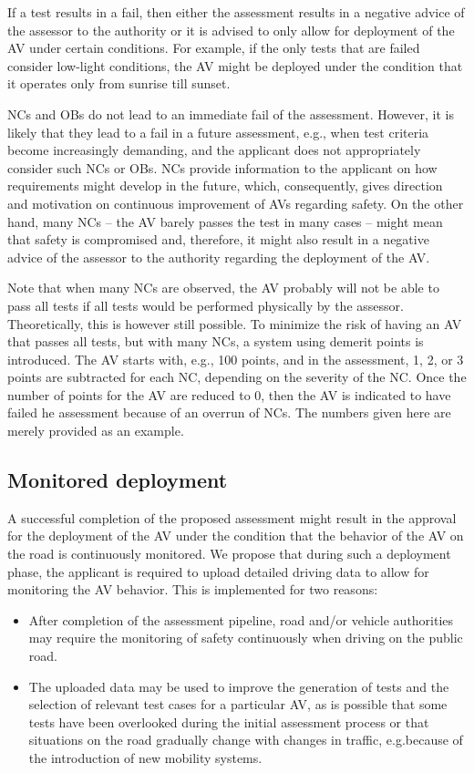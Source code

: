 \documentclass[twoside,twocolumn,9pt]{article}
\theoremstyle{plain}
\theoremstyle{remark}\newtheorem{remarkenv}{Remark}        %
\begin{document}
If a test results in a fail, then either the assessment results in a negative advice of the assessor to the authority or it is advised to only allow for deployment of the AV under certain conditions. For example, if the only tests that are failed consider low-light conditions, the AV might be deployed under the condition that it operates only from sunrise till sunset. 

NCs and OBs do not lead to an immediate fail of the assessment. However, it is likely that they lead to a fail in a future assessment, e.g., when test criteria become increasingly demanding, and the applicant does not appropriately consider such NCs or OBs. NCs provide information to the applicant on how requirements might develop in the future, which, consequently, gives direction and motivation on continuous improvement of AVs regarding safety. On the other hand, many NCs – the AV barely passes the test in many cases – might mean that safety is compromised and, therefore, it might also result in a negative advice of the assessor to the authority regarding the deployment of the AV.

Note that when many NCs are observed, the AV probably will not be able to pass all tests if all tests would be performed physically by the assessor. Theoretically, this is however still possible. To minimize the risk of having an AV that passes all tests, but with many NCs, a system using demerit points is introduced. The AV starts with, e.g., 100 points, and in the assessment, 1, 2, or 3 points are subtracted for each NC, depending on the severity of the NC. Once the number of points for the AV are reduced to 0, then the AV is indicated to have failed he assessment because of an overrun of NCs. The numbers given here are merely provided as an example.



\subsection{Monitored deployment}
\label{sec:monitored deployment}

A successful completion of the proposed assessment might result in the approval for the deployment of the AV under the condition that the behavior of the AV on the road is continuously monitored. We propose that during such a deployment phase, the applicant is required to upload detailed driving data to allow for monitoring the AV behavior. This is implemented for two reasons:
\begin{itemize}
	\item After completion of the assessment pipeline, road and/or vehicle authorities may require the monitoring of safety continuously when driving on the public road.
	\item The uploaded data may be used to improve the generation of tests and the selection of relevant test cases for a particular AV, as is possible that some tests have been overlooked during the initial assessment process or that situations on the road gradually change with changes in traffic, e.g.because of the introduction of new mobility systems.
\end{itemize}
\end{document}
